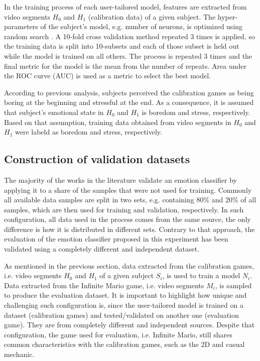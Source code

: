 In the training process of each user-tailored model, features are extracted from video segments $H_0$ and $H_1$ (calibration data) of a given subject. The hyper-parameters of the subject's model, e.g. number of neurons, is optimized using random search \parencite{bergstra2012random}. A 10-fold cross validation method repeated 3 times is applied, so the training data is split into 10-subsets and each of those subset is held out while the model is trained on all others. The process is repeated 3 times and the final metric for the model is the mean from the number of repeats. Area under the ROC curve (AUC) is used as a metric to select the best model.

According to previous analysis, subjects perceived the calibration games as being boring at the beginning and stressful at the end. As a consequence, it is assumed that subject's emotional state in $H_0$ and $H_1$ is boredom and stress, respectively. Based on that assumption, training data obtained from video segments in $H_0$ and $H_1$ were labeld as boredom and stress, respectively.

\subsection{Construction of validation datasets}
\label{sec:experiment2-construction-validation}

The majority of the works in the literature validate an emotion classifier by applying it to a share of the samples that were not used for training. Commonly all available data samples are split in two sets, e.g. containing 80\% and 20\% of all samples, which are then used for training and validation, respectively. In such configuration, all data used in the process comes from the same source, the only difference is how it is distributed in different sets. Contrary to that approach, the evaluation of the emotion classifier proposed in this experiment has been validated using a completely different and independent dataset.

As mentioned in the previous section, data extracted from the calibration games, i.e. video segments $H_0$ and $H_1$ of a given subject $S_i$, is used to train a model $N_i$. Data extracted from the Infinite Mario game, i.e. video segments $M_i$, is sampled to produce the evaluation dataset. It is important to highlight how unique and challenging such configuration is, since the user-tailored model is trained on a dataset (calibration games) and tested/validated on another one (evaluation game). They are from completely different and independent sources. Despite that configuration, the game used for evaluation, i.e. Infinite Mario, still shares common characteristics with the calibration games, such as the 2D and casual mechanic.

